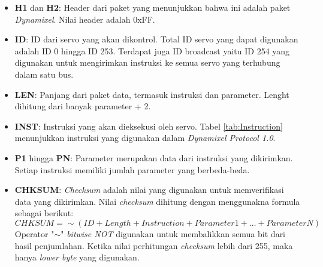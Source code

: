 \begin{itemize}
  \item \textbf{H1} dan \textbf{H2}: Header dari paket yang menunjukkan bahwa ini adalah
  paket \emph{Dynamixel}. Nilai header adalah 0xFF.
  \item \textbf{ID}: ID dari servo yang akan dikontrol. Total ID servo yang dapat digunakan
  adalah ID 0 hingga ID 253. Terdapat juga ID broadcast yaitu ID 254 yang digunakan
  untuk mengirimkan instruksi ke semua servo yang terhubung dalam satu bus.
  \item \textbf{LEN}: Panjang dari paket data, termasuk instruksi dan parameter. Lenght 
  dihitung dari banyak parameter + 2.
  \item \textbf{INST}: Instruksi yang akan dieksekusi oleh servo. Tabel \ref{tab:Instruction}
  menunjukkan instruksi yang digunakan dalam \emph{Dynamixel Protocol 1.0}.
  \item \textbf{P1} hingga \textbf{PN}: Parameter merupakan data dari instruksi yang dikirimkan. 
  Setiap instruksi memiliki jumlah parameter yang berbeda-beda. 
  \item \textbf{CHKSUM}: \emph{Checksum} adalah nilai yang digunakan untuk memverifikasi
  data yang dikirimkan. Nilai  \emph{checksum} dihitung dengan menggunakna formula sebagai 
  berikut:
  \begin{equation}
    \label{eq:Checksum}
    CHKSUM = \sim ( ID + Length + Instruction + Parameter1 + \ldots + Parameter N )
  \end{equation}
  Operator "$\sim$" \emph{bitwise NOT} digunakan untuk membalikkan semua bit dari hasil penjumlahan.
  Ketika nilai perhitungan \emph{checksum} lebih dari 255, maka hanya \emph{lower byte} yang digunakan.
\end{itemize}
